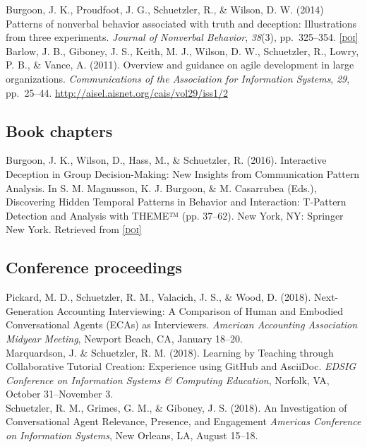 \documentclass[10pt, letter]{article}
\newcommand{\doi}[1]{\href{#1}{\scriptsize\textsc{[doi]}}}
\newcommand{\years}[1]{\marginnote{\scriptsize #1}}
\begin{document}
\years{2014}Burgoon, J. K., Proudfoot, J. G., Schuetzler, R., \& Wilson, D. W. (2014)
Patterns of nonverbal behavior associated with truth and deception: Illustrations from
three experiments. \emph{Journal of Nonverbal
  Behavior}, \emph{38}(3), pp.\ 325--354. \doi{http://dx.doi.org/10.1007/s10919-014-0181-5}\\

\years{2011}Barlow, J. B., Giboney, J. S., Keith, M. J., Wilson, D. W., Schuetzler, R.,
Lowry, P. B., \& Vance, A. (2011). Overview and guidance on agile development in large
organizations. \emph{Communications of the Association for Information Systems}, \emph{29},
pp.\ 25--44. \url{http://aisel.aisnet.org/cais/vol29/iss1/2}
\newpage
\subsection*{Book chapters}
\noindent

\years{2016} Burgoon, J. K., Wilson, D., Hass, M., \& Schuetzler, R. (2016). Interactive Deception in Group Decision-Making: New Insights from Communication Pattern Analysis. In S. M. Magnusson, K. J. Burgoon, \& M. Casarrubea (Eds.), Discovering Hidden Temporal Patterns in Behavior and Interaction: T-Pattern Detection and Analysis with THEME™ (pp. 37–62). New York, NY: Springer New York. Retrieved from \doi{http://dx.doi.org/10.1007/978-1-4939-3249-8_2}

\subsection*{Conference proceedings}
\noindent
\years{2018} Pickard, M. D., Schuetzler, R. M., Valacich, J. S., \& Wood, D. (2018).
Next-Generation Accounting Interviewing: A Comparison of Human and Embodied Conversational Agents (ECAs) as Interviewers.
\emph{American Accounting Association Midyear Meeting}, Newport Beach, CA, January 18--20.\\

\years{} Marquardson, J. \& Schuetzler, R. M. (2018).
Learning by Teaching through Collaborative Tutorial Creation: Experience using GitHub and AsciiDoc.
\emph{EDSIG Conference on Information Systems \& Computing Education}, Norfolk, VA, October 31--November 3.\\

\years{} Schuetzler, R. M., Grimes, G. M., \& Giboney, J. S. (2018).
An Investigation of Conversational Agent Relevance, Presence, and Engagement
\emph{Americas Conference on Information Systems}, New Orleans, LA, August 15--18.\\
\end{document}
